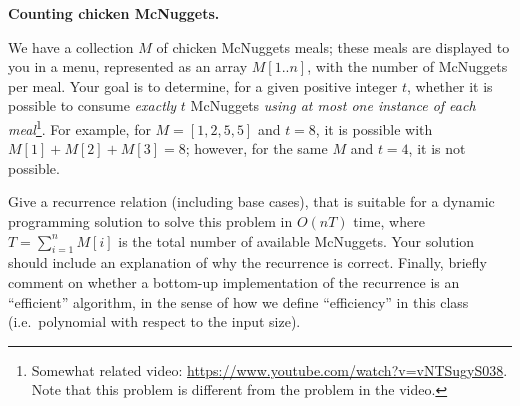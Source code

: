 \documentclass[11pt,addpoints]{exam}
\begin{document}
\begin{questions}
\begin{solution}
\end{solution}

\question[15] \textbf{Counting chicken McNuggets.}

    We have a collection $M$ of chicken McNuggets meals; these meals are displayed to you in a menu, represented as an array $M[1..n]$, with the number of McNuggets per meal. Your goal is to determine, for a given positive integer $t$, whether it is possible to consume \emph{exactly} $t$ McNuggets \emph{using at most one instance of each meal}\footnote{Somewhat related video: \url{https://www.youtube.com/watch?v=vNTSugyS038}. Note that this problem is different from the problem in the video.}.  For example, for $M = [1, 2, 5, 5]$ and $t = 8$, it is possible with $M[1] + M[2] + M[3] = 8$; however, for the same $M$ and $t = 4$, it is not possible.
    
    Give a recurrence relation (including base cases), that is suitable for a dynamic programming solution to solve this problem in $O(nT)$ time, where $T = \sum_{i=1}^n M[i]$ is the total number of available McNuggets. Your solution should include an explanation of why the recurrence is correct. Finally, briefly comment on whether a bottom-up implementation of the recurrence is an ``efficient'' algorithm, in the sense of how we define ``efficiency'' in this class (i.e.~polynomial with respect to the input size).
    

\end{questions}
\end{document}

